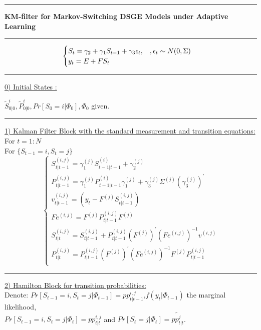 \documentclass[12pt,reqno]{article}
\numberwithin{equation}{section}
\begin{document}
\begin{table}[H]
\noindent\rule{\textwidth}{1pt}
\textbf{KM-filter for Markov-Switching DSGE Models under Adaptive Learning}\\
\noindent\rule{\textwidth}{1pt}
$$
\begin{cases}
S_t = \gamma_2 + \gamma_1 S_{t-1} + \gamma_3 \epsilon_t, \hspace{3 mm}, \epsilon_t \sim N(0, \Sigma) \\
y_t = E+ F S_t \\
\end{cases}
$$

\noindent\rule{\textwidth}{1pt}

\underline{0) Initial  States :}

$ \tilde{S}_{0|0}^{i}, \tilde{P}_{0|0}^{i}, Pr[ S_0=i | \Phi_0] , \Phi_0$  given.\\
\noindent\rule{\textwidth}{1pt}

\noindent
\underline{1) Kalman Filter Block with the standard measurement and transition equations:} \\
For $t=1:N$\\
    For $\{S_{t-1}=i, S_t=j\} $
\noindent
$$
\begin{cases}
S_{t|t-1}^{(i,j)}=\gamma_1^{(j)} S_{t-1|t-1}^{(i)} + \gamma_2^{(j)} \\
P_{t|t-1}^{(i,j)}=\gamma_1^{(j)} P_{t-1|t-1}^{(i)} \gamma_1^{(j)} + \gamma_3^{(j)} \Sigma^{(j)} (\gamma_3^{(j)})^{\prime} \\
v^{(i,j)}_{t|t-1} = (y_t - F^{(j)} S_{t|t-1}^{(i,j)})\\
Fe^{(i,j)}=F^{(j)} P_{t|t-1}^{(i,j)}F^{(j)} \\
S_{t|t}^{(i,j)}= S_{t|t-1}^{(i,j)} + P_{t|t-1}^{(i,j)} (F^{(j)})^{\prime} {(Fe^{(i,j)})}^{-1} v^{(i,j)} \\
P_{t|t}^{(i,j)} = P_{t|t-1}^{(i,j)} (F^{(j)})^{\prime} (Fe^{(i,j)})^{-1} F^{(j)} P_{t|t-1}^{(i,j)} \\
\end{cases}
$$

\vspace{5 mm}
\noindent\rule{\textwidth}{1pt}
\noindent
\underline{2)  Hamilton Block for transition probabilities:}\ \\

\noindent
Denote: $ Pr[S_{t-1}=i,S_t=j | \Phi_{t-1} ] = pp_{t|t-1}^{i,j} $,$f(y_t|\Phi_{t-1}) $ the marginal likelihood,\\ $Pr[S_{t-1}=i,S_t=j|\Phi_t]= pp_{t|t}^{i,j} $ and  $Pr[S_t=j|\Phi_t]= \tilde{pp_{t|t}^{j}}$.


\end{table}
\end{document}
